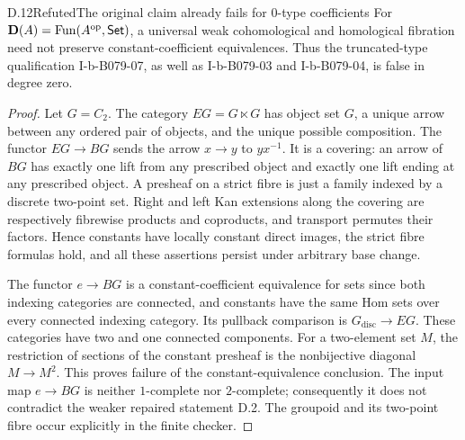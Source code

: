 \begin{claim}{D.12}{Refuted}{The original claim already fails for $0$-type coefficients}
For $\mathbf D(A)=\operatorname{Fun}(A^{\mathrm{op}},\mathsf{Set})$, a universal weak cohomological and homological fibration need not preserve constant-coefficient equivalences. Thus the truncated-type qualification I-b-B079-07, as well as I-b-B079-03 and I-b-B079-04, is false in degree zero.
\end{claim}
\begin{proof}
Let $G=C_2$. The category $EG=G\ltimes G$ has object set $G$, a unique arrow between any ordered pair of objects, and the unique possible composition. The functor $EG\to BG$ sends the arrow $x\to y$ to $yx^{-1}$. It is a covering: an arrow of $BG$ has exactly one lift from any prescribed object and exactly one lift ending at any prescribed object. A presheaf on a strict fibre is just a family indexed by a discrete two-point set. Right and left Kan extensions along the covering are respectively fibrewise products and coproducts, and transport permutes their factors. Hence constants have locally constant direct images, the strict fibre formulas hold, and all these assertions persist under arbitrary base change.

The functor $e\to BG$ is a constant-coefficient equivalence for sets since both indexing categories are connected, and constants have the same Hom sets over every connected indexing category. Its pullback comparison is $G_{\mathrm{disc}}\to EG$. These categories have two and one connected components. For a two-element set $M$, the restriction of sections of the constant presheaf is the nonbijective diagonal $M\to M^2$. This proves failure of the constant-equivalence conclusion. The input map $e\to BG$ is neither $1$-complete nor $2$-complete; consequently it does not contradict the weaker repaired statement D.2. The groupoid and its two-point fibre occur explicitly in the finite checker.
\end{proof}
